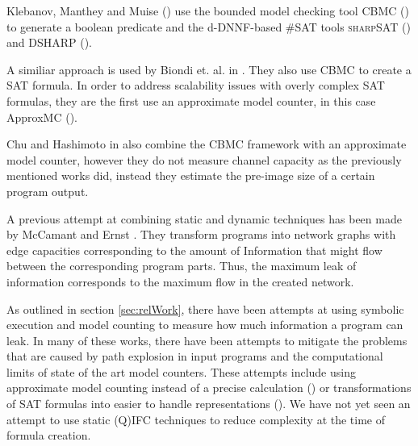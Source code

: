 Klebanov, Manthey and Muise (\cite{klebanov13}) use the bounded model checking tool CBMC (\cite{cbmc}) to generate a boolean predicate and the d-DNNF-based \#SAT tools \textsc{sharp}SAT (\cite{thurley06}) and \textsc{DSHARP} (\cite{muise12}).

A similiar approach is used by Biondi et. al. in \cite{biondi18}. They also use CBMC to create a SAT formula. In order to address scalability issues with overly complex SAT formulas, they are the first use an approximate model counter, in this case ApproxMC (\cite{chakraborty13}).

Chu and Hashimoto in \cite{chu19} also combine the CBMC framework with an approximate model counter, however they do not measure channel capacity as the previously mentioned works did, instead they estimate the pre-image size of a certain program output.

A previous attempt at combining static and dynamic techniques has been made by McCamant and Ernst \cite{mccamant08}. They transform programs into network graphs with edge capacities corresponding to the amount of Information that might flow between the corresponding program parts. Thus, the maximum leak of information corresponds to the maximum flow in the created network. 


As outlined in section \ref{sec:relWork}, there have been attempts at using symbolic execution and model counting to measure how much information a program can leak. In many of these works, there have been attempts to mitigate the problems that are caused by path explosion in input programs and the computational limits of state of the art model counters. These attempts include using approximate model counting instead of a precise calculation (\cite{biondi18, chu19}) or transformations of SAT formulas into easier to handle representations (\cite{klebanov13}). We have not yet seen an attempt to use static (Q)IFC techniques to reduce complexity at the time of formula creation.

